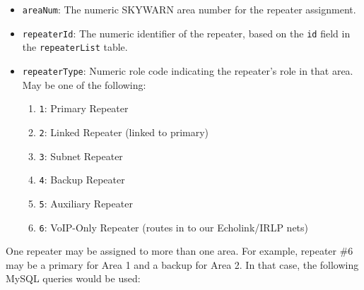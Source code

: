 \documentclass[pdflatex,letterpaper,twoside,12pt]{book}
\begin{document}
\begin{itemize}
\item \texttt{areaNum}:  The numeric SKYWARN area number for the repeater assignment.
\item \texttt{repeaterId}:  The numeric identifier of the repeater, based on the \texttt{id} field in the \texttt{repeaterList} table.
\item \texttt{repeaterType}: Numeric role code indicating the repeater's role in that area. May be one of the following:
	\begin{enumerate}
	\item \texttt{1}: Primary Repeater
	\item \texttt{2}: Linked Repeater (linked to primary)
	\item \texttt{3}: Subnet Repeater
	\item \texttt{4}: Backup Repeater
	\item \texttt{5}: Auxiliary Repeater
	\item \texttt{6}: VoIP-Only Repeater (routes in to our Echolink/IRLP nets)
	\end{enumerate}
\end{itemize}

One repeater may be assigned to more than one area.  For example, repeater \#6 may be a primary for Area 1 and a backup for Area 2.  In that case, the following MySQL queries would be used:
\end{document}
